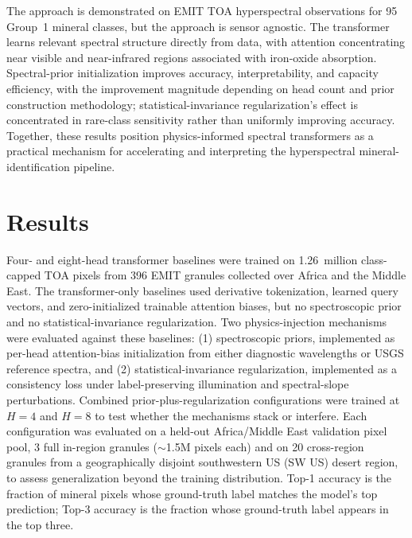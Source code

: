 \documentclass[11pt]{article}
\begin{document}
The approach is demonstrated on EMIT TOA hyperspectral observations for 95 Group~1 mineral classes, but the approach is sensor agnostic.
The transformer learns relevant spectral structure directly from data, with attention concentrating near visible and near-infrared regions associated with iron-oxide absorption.
Spectral-prior initialization improves accuracy, interpretability, and capacity efficiency, with the improvement magnitude depending on head count and prior construction methodology; 
statistical-invariance regularization's effect is concentrated in rare-class sensitivity rather than uniformly improving accuracy.
Together, these results position physics-informed spectral transformers as a practical mechanism for accelerating and interpreting the hyperspectral mineral-identification pipeline.

\section{Results}

Four- and eight-head transformer baselines were trained on 1.26~million class-capped TOA pixels from 396 EMIT granules collected over Africa and the Middle East.
The transformer-only baselines used derivative tokenization, learned query vectors, and zero-initialized trainable attention biases, but no spectroscopic prior and no statistical-invariance regularization.
Two physics-injection mechanisms were evaluated against these baselines:
(1) spectroscopic priors, implemented as per-head attention-bias initialization from either diagnostic wavelengths or USGS reference spectra, and
(2) statistical-invariance regularization, implemented as a consistency loss under label-preserving illumination and spectral-slope perturbations.
Combined prior-plus-regularization configurations were trained at $H = 4$ and $H = 8$ to test whether the mechanisms stack or interfere.
Each configuration was evaluated on a held-out Africa/Middle East validation pixel pool, 3 full in-region granules ($\sim$1.5M pixels each) and on 20 cross-region granules from a geographically disjoint southwestern US (SW US) desert region, to assess generalization beyond the training distribution.
Top-1 accuracy is the fraction of mineral pixels whose ground-truth label matches the model's top prediction;
Top-3 accuracy is the fraction whose ground-truth label appears in the top three.
\end{document}
